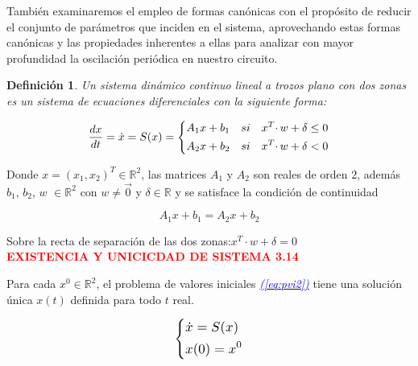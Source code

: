 \documentclass[12pt,a4paper]{report} %
\newtheorem{definicion}{Definición}[chapter] %
\newcommand{\eref}[1]{\hyperref[#1]{\textcolor{blue}{\textit{(\ref*{#1})}}}}
\begin{document}
	\vspace{0.5cm}\noindent También examinaremos el empleo de formas canónicas con el propósito de reducir el conjunto de parámetros que inciden en el sistema, aprovechando estas formas canónicas y las propiedades inherentes a ellas para analizar con mayor profundidad la oscilación periódica en nuestro circuito.
	
	\begin{definicion}
		Un sistema dinámico continuo lineal a trozos plano con dos zonas es un sistema de ecuaciones diferenciales con la siguiente forma:
	\end{definicion}
	
	\begin{equation}
		\frac{dx}{dt}=\dot{x}=S(x)=
		\label{eq:biz1}
		\scalebox{1}{$\displaystyle
			\left\{
			\begin{aligned}
			 A_1x+b_1\quad si \quad x^T\cdotp w+\delta \leq 0 \\
			 A_2x+b_2\quad si \quad x^T\cdotp w+\delta < 0
			\end{aligned}
			\right.
			$}
	\end{equation}\smallskip
	
	\noindent Donde $x=(x_1,x_2)^T\in \mathbb{R}^2$, las matrices $A_1$ y $A_2$ son reales de orden $2$, además\\ $b_1$, $b_2$, $w$ $\in \mathbb{R}^2$ con $w\neq\vec{0}$ y $\delta \in \mathbb{R}$ y se satisface la condición de continuidad
	
	\begin{equation}
		A_1x+b_1=A_2x+b_2 
	\end{equation}\smallskip
	
	\noindent Sobre la recta de separación de las dos zonas:\quad $x^T\cdotp w+\delta = 0$ \\[0.5cm]
	
	\textbf{\textcolor{red}{EXISTENCIA Y UNICICDAD DE SISTEMA 3.14}}

	\noindent Para cada $x^0 \in \mathbb{R}^2$, el problema de valores iniciales \eref{eq:pvi2} tiene una solución única $x(t)$ definida para todo $t$ real.
	
	\begin{equation}
		\label{eq:pvi2}
		\scalebox{1.2}{$\displaystyle
			\left\{
			\begin{aligned}
				&\dot{x}=S(x)\\
				&x(0)=x^0
			\end{aligned}
			\right.
			$}
	\end{equation}\smallskip
	
\end{document}
